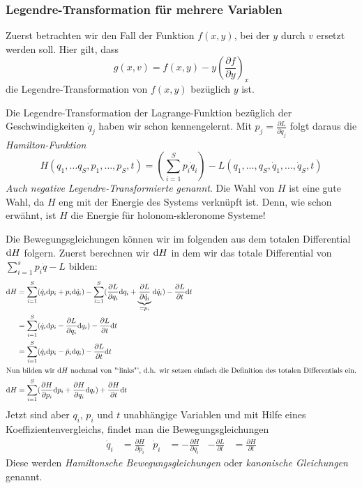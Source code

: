 \subsubsection{Legendre-Transformation für mehrere Variablen}
Zuerst betrachten wir den Fall der Funktion $f(x,y)$, bei der $y$ durch $v$ ersetzt werden soll. Hier gilt, dass
\[g(x,v) = f(x,y) - y\left(\frac{\partial f}{\partial y}\right)_x\]
die Legendre-Transformation von $f(x,y)$ bezüglich $y$ ist.

Die Legendre-Transformation der Lagrange-Funktion bezüglich der Geschwindigkeiten $\dot q_j$ haben wir schon kennengelernt. Mit $p_j = \frac{\partial L}{\partial \dot q_j}$ folgt daraus die \emph{Hamilton-Funktion}
\[H(q_1,\ldots q_S,  p_1,\ldots, p_S,t) = \left(\sum\limits_{i=1}^S p_i \dot q_i\right) - L(q_1, \ldots,q_S, \dot q_1, \ldots, \dot q_S, t)\]
\textit{Auch negative Legendre-Transformierte genannt}.
Die Wahl von $H$ ist eine gute Wahl, da $H$ eng mit der Energie des Systems verknüpft ist. Denn, wie schon erwähnt, ist $H$ die Energie für holonom-skleronome Systeme!

Die Bewegungsgleichungen können wir im folgenden aus dem totalen Differential $\mathrm d H$ folgern.
Zuerst berechnen wir $\mathrm d H$ in dem wir das totale Differential von $\sum_{i=1}^s p_i \dot{q} - L$ bilden:
\begin{align*}
\mathrm d H &= \sum\limits_{i=1}^S (\dot q_i \mathrm d p_i + p_i \mathrm d \dot q_i) - \sum\limits_{i=1}^S (\frac{\partial L}{\partial q_i} \mathrm d q_i + \underbrace{\frac{\partial L}{\partial \dot q_i}}_{=p_i} \mathrm d \dot q_i) - \frac{\partial L}{\partial t} \mathrm d t\\
&=\sum\limits_{i=1}^S(\dot q_i \mathrm d p_i - \frac{\partial L}{\partial q_i}\mathrm d q_i) - \frac{\partial L}{\partial t}\mathrm d t\\
&=\sum\limits_{i=1}^S(\dot q_i \mathrm d p_i - \dot p_i\mathrm d q_i) - \frac{\partial L}{\partial t}\mathrm d t\\
\intertext{Nun bilden wir $\mathrm d H$ nochmal von "`links"', d.h. wir setzen einfach die Definition des totalen Differentials ein.}
\mathrm d H &= \sum\limits_{i=1}^S(\frac{\partial H}{\partial p_i}\mathrm d p_i + \frac{\partial H}{\partial q_i}\mathrm d q_i) + \frac{\partial H}{\partial t}\mathrm d t\\
\end{align*}
Jetzt sind aber $q_i$, $p_i$ und $t$ unabhängige Variablen und mit Hilfe eines Koeffizientenvergleichs, findet man die Bewegungsgleichungen
\begin{align*}
\dot q_i &= \frac{\partial H}{\partial p_i} & \dot p_i &= - \frac{\partial H}{\partial q_i} & -\frac{\partial L}{\partial t} &= \frac{\partial H}{\partial t}
\end{align*}
Diese werden \emph{Hamiltonsche Bewegungsgleichungen} oder \emph{kanonische Gleichungen} genannt.

